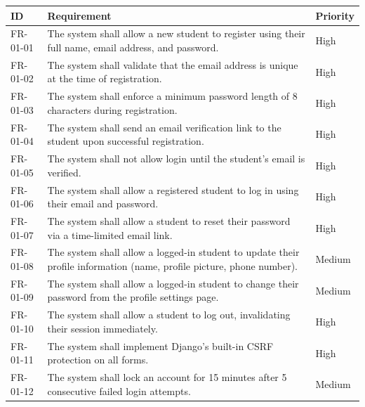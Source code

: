\documentclass[
]{article}
\begin{document}
\begin{longtable}[]{@{}
  >{\raggedright\arraybackslash}p{}
  >{\raggedright\arraybackslash}p{}
  >{\raggedright\arraybackslash}p{}@{}}
\toprule\noalign{}
\begin{minipage}[b]{\linewidth}\raggedright
ID
\end{minipage} & \begin{minipage}[b]{\linewidth}\raggedright
Requirement
\end{minipage} & \begin{minipage}[b]{\linewidth}\raggedright
Priority
\end{minipage} \\
\midrule\noalign{}
\endhead
\bottomrule\noalign{}
\endlastfoot
FR-01-01 & The system shall allow a new student to register using their
full name, email address, and password. & High \\
FR-01-02 & The system shall validate that the email address is unique at
the time of registration. & High \\
FR-01-03 & The system shall enforce a minimum password length of 8
characters during registration. & High \\
FR-01-04 & The system shall send an email verification link to the
student upon successful registration. & High \\
FR-01-05 & The system shall not allow login until the student's email is
verified. & High \\
FR-01-06 & The system shall allow a registered student to log in using
their email and password. & High \\
FR-01-07 & The system shall allow a student to reset their password via
a time-limited email link. & High \\
FR-01-08 & The system shall allow a logged-in student to update their
profile information (name, profile picture, phone number). & Medium \\
FR-01-09 & The system shall allow a logged-in student to change their
password from the profile settings page. & Medium \\
FR-01-10 & The system shall allow a student to log out, invalidating
their session immediately. & High \\
FR-01-11 & The system shall implement Django's built-in CSRF protection
on all forms. & High \\
FR-01-12 & The system shall lock an account for 15 minutes after 5
consecutive failed login attempts. & Medium \\
\end{longtable}
\end{document}
